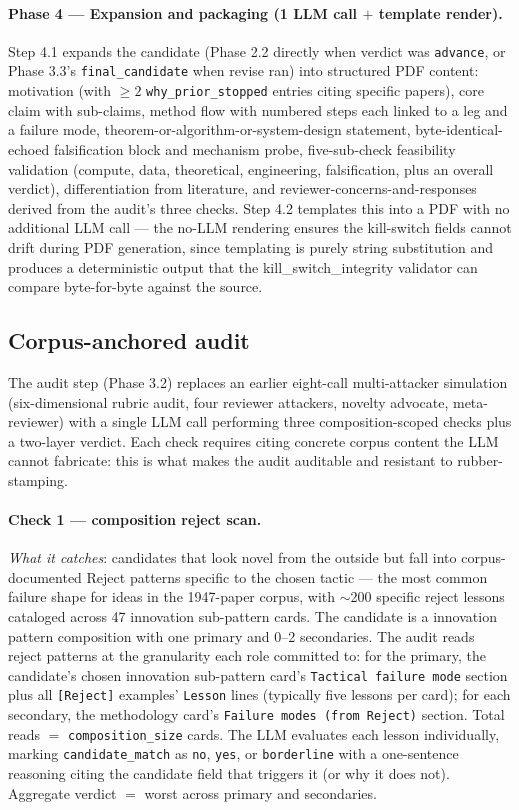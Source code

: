 \documentclass[10pt,a4paper]{article}
\begin{document}
\paragraph{Phase 4 --- Expansion and packaging (1 LLM call $+$ template render).} Step 4.1 expands the candidate (Phase 2.2 directly when verdict was \texttt{advance}, or Phase 3.3's \texttt{final\_candidate} when revise ran) into structured PDF content: motivation (with $\geq 2$ \texttt{why\_prior\_stopped} entries citing specific papers), core claim with sub-claims, method flow with numbered steps each linked to a leg and a failure mode, theorem-or-algorithm-or-system-design statement, byte-identical-echoed falsification block and mechanism probe, five-sub-check feasibility validation (compute, data, theoretical, engineering, falsification, plus an overall verdict), differentiation from literature, and reviewer-concerns-and-responses derived from the audit's three checks. Step 4.2 templates this into a PDF with no additional LLM call --- the no-LLM rendering ensures the kill-switch fields cannot drift during PDF generation, since templating is purely string substitution and produces a deterministic output that the kill\_switch\_integrity validator can compare byte-for-byte against the source.

\subsection{Corpus-anchored audit}
\label{subsec:skill-audit}

The audit step (Phase 3.2) replaces an earlier eight-call multi-attacker simulation (six-dimensional rubric audit, four reviewer attackers, novelty advocate, meta-reviewer) with a single LLM call performing three composition-scoped checks plus a two-layer verdict. Each check requires citing concrete corpus content the LLM cannot fabricate: this is what makes the audit auditable and resistant to rubber-stamping.

\paragraph{Check 1 --- composition reject scan.} \emph{What it catches}: candidates that look novel from the outside but fall into corpus-documented Reject patterns specific to the chosen tactic --- the most common failure shape for ideas in the 1947-paper corpus, with $\sim$200 specific reject lessons cataloged across 47 innovation sub-pattern cards. The candidate is a innovation pattern composition with one primary and 0--2 secondaries. The audit reads reject patterns at the granularity each role committed to: for the primary, the candidate's chosen innovation sub-pattern card's \texttt{Tactical failure mode} section plus all \texttt{[Reject]} examples' \texttt{Lesson} lines (typically five lessons per card); for each secondary, the methodology card's \texttt{Failure modes (from Reject)} section. Total reads $=$ \texttt{composition\_size} cards. The LLM evaluates each lesson individually, marking \texttt{candidate\_match} as \texttt{no}, \texttt{yes}, or \texttt{borderline} with a one-sentence reasoning citing the candidate field that triggers it (or why it does not). Aggregate verdict $=$ worst across primary and secondaries.
\end{document}
